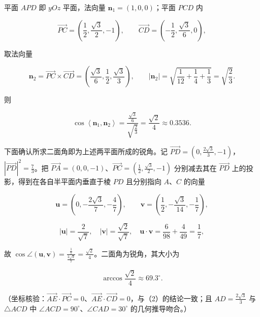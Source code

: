 \begin{answer}
平面 $APD$ 即 $yOz$ 平面，法向量 $\boldsymbol n_1=(1,0,0)$；平面 $PCD$ 内

\nopagebreak[4]
\[\overrightarrow{PC}=\left(\frac12,\frac{\sqrt3}2,-1\right),\qquad \overrightarrow{CD}=\left(-\frac12,\frac{\sqrt3}6,0\right),\]

取法向量

\nopagebreak[4]
\[\boldsymbol n_2=\overrightarrow{PC}\times\overrightarrow{CD}=\left(\frac{\sqrt3}6,\frac12,\frac{\sqrt3}3\right),\qquad |\boldsymbol n_2|=\sqrt{\frac1{12}+\frac14+\frac13}=\sqrt{\frac23}.\]

则

\nopagebreak[4]
\[\cos\left\langle\boldsymbol n_1,\boldsymbol n_2\right\rangle=\frac{\frac{\sqrt3}6}{\sqrt{\frac23}}=\frac{\sqrt2}4 \approx0.3536 .\]

下面确认所求二面角即为上述两平面所成的锐角。记 $\overrightarrow{PD}=\left(0,\frac{2\sqrt3}3,-1\right)$，$|\overrightarrow{PD}|^2=\frac73$。把 $\overrightarrow{PA}=(0,0,-1)$、$\overrightarrow{PC}=\left(\frac12,\frac{\sqrt3}2,-1\right)$ 分别减去其在 $\overrightarrow{PD}$ 上的投影，得到在各自半平面内垂直于棱 $PD$ 且分别指向 $A$、$C$ 的向量

\nopagebreak[4]
\[\boldsymbol u=\left(0,-\frac{2\sqrt3}7,-\frac47\right),\qquad \boldsymbol v=\left(\frac12,-\frac{\sqrt3}{14},-\frac17\right),\]

\nopagebreak[4]
\[|\boldsymbol u|=\frac{2}{\sqrt7},\quad|\boldsymbol v|=\frac{\sqrt2}{\sqrt7},\quad\boldsymbol u\cdot\boldsymbol v=\frac{6}{98}+\frac{4}{49}=\frac17,\]

故 $\cos\angle(\boldsymbol u,\boldsymbol v)=\frac{\frac17}{\frac{2\sqrt2}7}=\frac{\sqrt2}4$。二面角为锐角，其大小为

\nopagebreak[4]
\[\arccos\frac{\sqrt2}4\approx69.3^\circ .\]

（坐标核验：$\overrightarrow{AE}\cdot\overrightarrow{PC}=0$、$\overrightarrow{AE}\cdot\overrightarrow{CD}=0$，与（2）的结论一致；且 $AD=\frac{2\sqrt3}3$ 与 $\triangle ACD$ 中 $\angle ACD=90^\circ$、$\angle CAD=30^\circ$ 的几何推导吻合。）


\end{answer}
